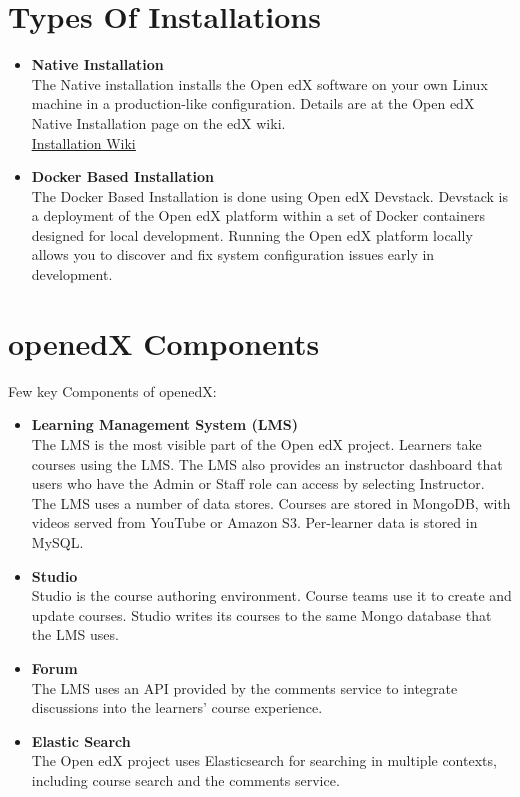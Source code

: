\documentclass[11pt]{report}
\begin{document}
	\section{Types Of Installations}
	\begin{itemize}
		\large
		\item \textbf{Native Installation} \ \\
		The Native installation installs the Open edX software on your own Linux machine in a production-like configuration. Details are at the Open edX Native Installation page on the edX wiki. \ \\
		\underline{\href{https://openedx.atlassian.net/wiki/spaces/OpenOPS/pages/146440579/Native+Open+edX+Ubuntu+16.04+64+bit+Installation}{Installation Wiki}}
		
		\item \textbf{Docker Based Installation} \ \\
		The Docker Based Installation is done using Open edX Devstack.
		Devstack is a deployment of the Open edX platform within a set of Docker containers designed for local development. Running the Open edX platform locally allows you to discover and fix system configuration issues early in development.
	\end{itemize}
	\pagebreak
	\section{openedX Components}
	\large
	Few key Components of openedX:
	\begin{itemize}
		\item \textbf{Learning Management System (LMS)} \ \\
		The LMS is the most visible part of the Open edX project. Learners take courses using the LMS. The LMS also provides an instructor dashboard that users who have the Admin or Staff role can access by selecting Instructor. \ \\
		The LMS uses a number of data stores. Courses are stored in MongoDB, with videos served from YouTube or Amazon S3. Per-learner data is stored in MySQL.
		\item \textbf{Studio} \ \\
		Studio is the course authoring environment. Course teams use it to create and update courses. Studio writes its courses to the same Mongo database that the LMS uses.
		\item \textbf{Forum} \ \\
		The LMS uses an API provided by the comments service to integrate discussions into the learners’ course experience.
		\item \textbf{Elastic Search} \ \\
		The Open edX project uses Elasticsearch for searching in multiple contexts, including course search and the comments service.
		
	\end{itemize}
\end{document}

